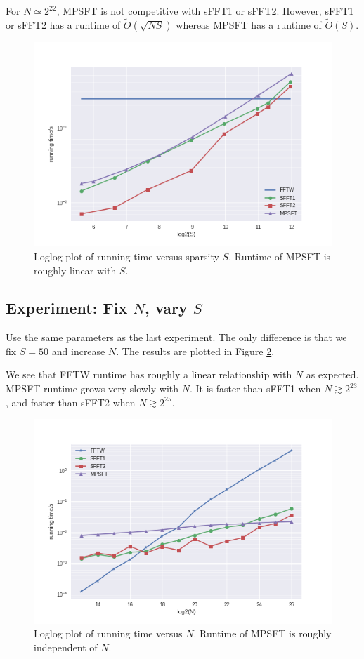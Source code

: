 \documentclass[10pt]{article}
\begin{document}
For $N\simeq 2^{22}$, MPSFT is not competitive with sFFT1 or sFFT2. However, sFFT1 or sFFT2 has a runtime of $\tilde{O}(\sqrt{NS})$ whereas MPSFT has a runtime of $\tilde{O}(S)$.

\begin{figure}
\centering
\includegraphics[scale=0.6]{./graph/runtime_vary_k}
\caption{Loglog plot of running time versus sparsity $S$. Runtime of MPSFT is roughly linear with $S$. \label{fig:runtime_vary_k}}
\end{figure}

\subsection{Experiment: Fix $N$, vary $S$}
Use the same parameters as the last experiment. The only difference is that we fix $S=50$ and increase $N$. The results are plotted in Figure \ref{fig:runtime_vary_n}.

We see that FFTW runtime has roughly a linear relationship with $N$ as expected. MPSFT runtime grows very slowly with $N$. It is faster than sFFT1 when $N \gtrsim 2^{23}$, and faster than sFFT2 when $N \gtrsim 2^{25}$.

\begin{figure}
\centering
\includegraphics[scale=0.6]{./graph/runtime_vary_n}
\caption{Loglog plot of running time versus $N$. Runtime of MPSFT is roughly independent of $N$. \label{fig:runtime_vary_n}}
\end{figure}
\end{document}
